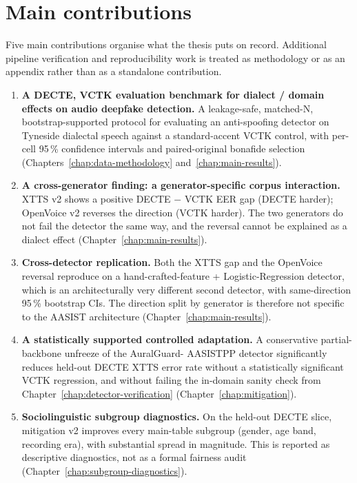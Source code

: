\section{Main contributions}
\label{sec:introduction-contributions}

Five main contributions organise what the thesis puts on record.
Additional pipeline verification and reproducibility work is
treated as methodology or as an appendix rather than as a
standalone contribution.

\begin{enumerate}
    \item \textbf{A DECTE, VCTK evaluation benchmark for dialect / domain
        effects on audio deepfake detection.} A leakage-safe,
        matched-N, bootstrap-supported protocol for evaluating an
        anti-spoofing detector on Tyneside dialectal speech against a
        standard-accent VCTK control, with per-cell 95\,\% confidence
        intervals and paired-original bonafide selection (Chapters~\ref{chap:data-methodology}
        and~\ref{chap:main-results}).
    \item \textbf{A cross-generator finding: a generator-specific corpus
        interaction.} XTTS v2 shows a positive DECTE $-$ VCTK EER gap
        (DECTE harder); OpenVoice v2 reverses the direction (VCTK
        harder). The two generators do not fail the detector the same
        way, and the reversal cannot be explained as a dialect effect
        (Chapter~\ref{chap:main-results}).
    \item \textbf{Cross-detector replication.} Both the XTTS gap and the
        OpenVoice reversal reproduce on a hand-crafted-feature +
        Logistic-Regression detector, which is an architecturally very
        different second detector, with same-direction 95\,\%
        bootstrap CIs. The direction split by generator is therefore
        not specific to the AASIST architecture (Chapter~\ref{chap:main-results}).
    \item \textbf{A statistically supported controlled adaptation.} A
        conservative partial-backbone unfreeze of the AuralGuard-%
        AASISTPP detector significantly reduces held-out DECTE XTTS
        error rate without a statistically significant VCTK
        regression, and without failing the in-domain sanity check
        from Chapter~\ref{chap:detector-verification} (Chapter~\ref{chap:mitigation}).
    \item \textbf{Sociolinguistic subgroup diagnostics.} On the held-out
        DECTE slice, mitigation v2 improves every main-table subgroup
        (gender, age band, recording era), with substantial spread in
        magnitude. This is reported as descriptive diagnostics, not as
        a formal fairness audit (Chapter~\ref{chap:subgroup-diagnostics}).
\end{enumerate}

